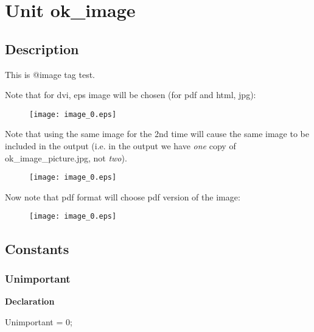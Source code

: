 \documentclass{report}
\newif\ifpdf
\begin{document}
\label{toc}\tableofcontents
\newpage
\newlength{\tmplength}
\chapter{Unit ok{\_}image}
\label{ok_image}
\section{Description}
This is @image tag test.\hfill\vspace*{1ex}



Note that for dvi, eps image will be chosen (for pdf and html, jpg):

\begin{figure}
  \ifpdf
    \texttt{[image: image\_1.jpg]}
  \else
    \texttt{[image: image\_0.eps]}
  \fi
\end{figure}


Note that using the same image for the 2nd time will cause the same image to be included in the output (i.e. in the output we have \textit{one} copy of ok{\_}image{\_}picture.jpg, not \textit{two}).

\begin{figure}
  \ifpdf
    \texttt{[image: image\_1.jpg]}
  \else
    \texttt{[image: image\_0.eps]}
  \fi
\end{figure}


Now note that pdf format will choose pdf version of the image:

\begin{figure}
  \ifpdf
    \texttt{[image: image\_2.pdf]}
  \else
    \texttt{[image: image\_0.eps]}
  \fi
\end{figure}

\section{Constants}
\ifpdf
\subsection*{\large{\textbf{Unimportant}}\normalsize\hspace{1ex}\hrulefill}
\else
\subsection*{Unimportant}
\fi
\label{ok_image-Unimportant}
\begin{list}{}{
\setlength{\itemindent}{0cm}
\setlength{\listparindent}{0cm}
\setlength{\leftmargin}{\evensidemargin}
\addtolength{\leftmargin}{\tmplength}
\settowidth{\labelsep}{X}
\addtolength{\leftmargin}{\labelsep}
\setlength{\labelwidth}{\tmplength}
}
\item[\textbf{Declaration}\hfill]
\ifpdf
\begin{flushleft}
\fi
\begin{ttfamily}
Unimportant = 0;\end{ttfamily}

\ifpdf
\end{flushleft}
\fi

\end{list}
\end{document}
